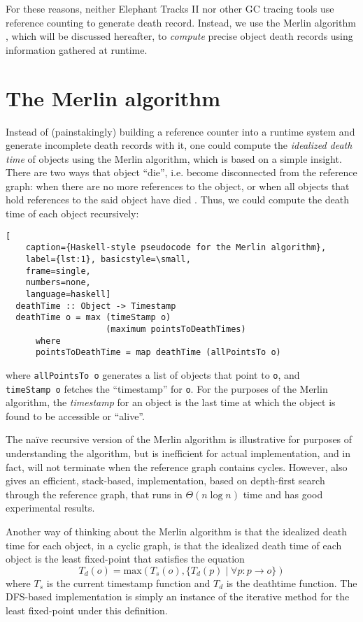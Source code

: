For these reasons, neither Elephant Tracks II nor other GC tracing tools \citep{MemInsight, ElephantTracks}
use reference counting to generate death record. Instead, we use the Merlin algorithm \citep{Merlin}, which
will be discussed hereafter, to \emph{compute} precise object death records using information gathered
at runtime.

\section{The Merlin algorithm}
Instead of (painstakingly) building a reference counter into a runtime system and generate incomplete death
records with it, one could compute the \emph{idealized death time} of objects using the Merlin algorithm, which
is based on a simple insight. There are two ways that object ``die'', i.e. become disconnected from the reference
graph: when there are no more references to the object, or when all objects that hold references to the said object
have died \citep{Merlin, MerlinSIGMETRICS, ElephantTracks}. Thus, we could compute the death time of each object recursively:
\newpage
\begin{lstlisting}[
    caption={Haskell-style pseudocode for the Merlin algorithm},
    label={lst:1}, basicstyle=\small,
    frame=single,
    numbers=none,
    language=haskell]
  deathTime :: Object -> Timestamp
  deathTime o = max (timeStamp o)
                    (maximum pointsToDeathTimes)
      where
      pointsToDeathTime = map deathTime (allPointsTo o)
\end{lstlisting}
where \lstinline{allPointsTo o} generates a list of objects that point to \lstinline{o}, and\\
\lstinline{timeStamp o} fetches the ``timestamp'' for \lstinline{o}. For the purposes of the Merlin algorithm,
the \emph{timestamp} for an object is the last time at which the object is found to be accessible or ``alive''.

The na\"{i}ve recursive version of the Merlin algorithm is illustrative for purposes of understanding the
algorithm, but is inefficient for actual implementation, and in fact, will not terminate when the reference graph
contains cycles. However, \cite{Merlin} also gives an efficient, stack-based, implementation, based
on depth-first search through the reference graph, that runs in $\Theta(n \log n)$ time and has good
experimental results.

Another way of thinking about the Merlin algorithm is that the idealized death time for each object, in a cyclic
graph, is that the idealized death time of each object is the least fixed-point that satisfies the equation
\begin{equation*}
  T_d(o) = \mathrm{max}(T_s(o), \{T_d(p) \mid \forall p : p \rightarrow o\})
\end{equation*}
where $T_s$ is the current timestamp function and $T_d$ is the deathtime function. The DFS-based implementation is simply
an instance of the iterative method for the least fixed-point under this definition.

